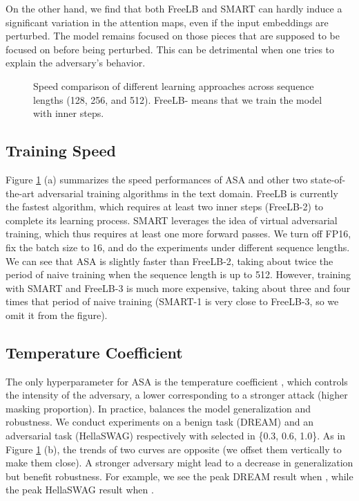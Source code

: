 \documentclass[letterpaper]{article} \usepackage{aaai23}  \usepackage{times}  \usepackage{helvet}  \usepackage{courier}  \usepackage[hyphens]{url}  \usepackage{graphicx} \urlstyle{rm} \def\UrlFont{\rm}  \usepackage{natbib}  \usepackage{caption} \frenchspacing  \setlength{\pdfpagewidth}{8.5in}  \setlength{\pdfpageheight}{11in}  \usepackage{algorithm}
\begin{document}
On the other hand, we find that both FreeLB and SMART can hardly induce a significant variation in the attention maps, even if the input embeddings are perturbed. The model remains focused on those pieces that are supposed to be focused on before being perturbed. This can be detrimental when one tries to explain the adversary's behavior.

\begin{figure}
\centering
{}
\caption{Speed comparison of different learning approaches across sequence lengths (128, 256, and 512). FreeLB- means that we train the model with  inner steps.}
\label{f4}
\end{figure}

\subsection{Training Speed}

Figure \ref{f4} (a) summarizes the speed performances of ASA and other two state-of-the-art adversarial training algorithms in the text domain. FreeLB \citep{DBLP:conf/iclr/ZhuCGSGL20} is currently the fastest algorithm, which requires at least two inner steps (FreeLB-2) to complete its learning process. SMART \citep{DBLP:conf/acl/JiangHCLGZ20} leverages the idea of virtual adversarial training, which thus requires at least one more forward passes. We turn off FP16, fix the batch size to 16, and do the experiments under different sequence lengths. We can see that ASA is slightly faster than FreeLB-2, taking about twice the period of naive training when the sequence length is up to 512. However, training with SMART and FreeLB-3 is much more expensive, taking about three and four times that period of naive training (SMART-1 is very close to FreeLB-3, so we omit it from the figure).

\subsection{Temperature Coefficient}

The only hyperparameter for ASA is the temperature coefficient , which controls the intensity of the adversary, a lower  corresponding to a stronger attack (higher masking proportion). In practice,  balances the model generalization and robustness. We conduct experiments on a benign task (DREAM) and an adversarial task (HellaSWAG) respectively with  selected in \{0.3, 0.6, 1.0\}. As in Figure \ref{f4} (b), the trends of two curves are opposite (we offset them vertically to make them close). A stronger adversary might lead to a decrease in generalization but benefit robustness. For example, we see the peak DREAM result when , while the peak HellaSWAG result when .
\end{document}
